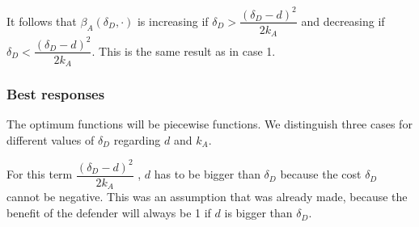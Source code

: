 It follows that $\beta_{A}(\delta_{D},\cdot)$ is increasing if $\delta_{D} > \dfrac{(\delta_{D}-d)^{2}}{2k_{A}}$ and decreasing if $\delta_{D} < \dfrac{(\delta_{D}-d)^{2}}{2k_{A}}$. This is the same result as in case 1.\\


\subsubsection{Best responses}
The optimum functions will be piecewise functions. We distinguish three cases for different values of $\delta_{D}$ regarding $d$ and $k_{A}$. 


For this term $\dfrac{(\delta_{D}-d)^{2}}{2k_{A}} $ , $d$ has to be bigger than  $\delta_{D}$ because the cost $\delta_{D}$ cannot be negative. This was an assumption that was already made, because the benefit of the defender will always be 1 if $d$ is bigger than  $\delta_{D}$.

